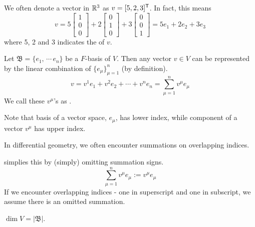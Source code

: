 \documentclass[a4paper, 10pt]{article}
\begin{document}
We often denote a vector in $\mathbb{R}^{3}$ as $v = [5, 2, 3]^{\mathsf{T}}$. In fact, this means
\[ v = 5\begin{bmatrix}1\\ 0\\ 0\end{bmatrix} + 2\begin{bmatrix}0\\ 1\\ 0\end{bmatrix} + 3\begin{bmatrix}0\\ 0\\ 1\end{bmatrix} = 5e_{1} + 2e_{2} + 3e_{3} \]
where 5, 2 and 3 indicates the  of $v$.
\begin{definition}
    Let $\mathfrak{B} = \{ e_{1}, \,\cdots\, e_{n}\}$ be a $F$-basis of $V$. Then any vector $v \in V$ can be represented by the linear combination of $\{ e_{\mu} \}_{\mu = 1}^{n}$ (by definition).
    \[ v = v^{1}e_{1} + v^{2}e_{2} + \cdots + v^{n}e_{n} = \sum_{\mu = 1}^{n} v^{\mu} e_{\mu} \]
    We call these $v^{\mu}$'s as .
\end{definition}
\begin{remark}
    Note that basis of a vector space, $e_{\mu}$, has lower index, while component of a vector $v^{\mu}$ has upper index.
\end{remark}
\begin{remark}
    In differential geometry, we often encounter summations on overlapping indices. 
    
     simplies this by (simply) omitting summation signs.
    \[ \sum_{\mu = 1}^{n} v^{\mu} e_{\mu} := v^{\mu} e_{\mu} \]
    If we encounter overlapping indices - one in superscript and one in subscript, we assume there is an omitted summation.
\end{remark}
\begin{definition}[Dimension]
    $\dim V = |\mathfrak{B}|$.
\end{definition}
\newpage

\end{document}
